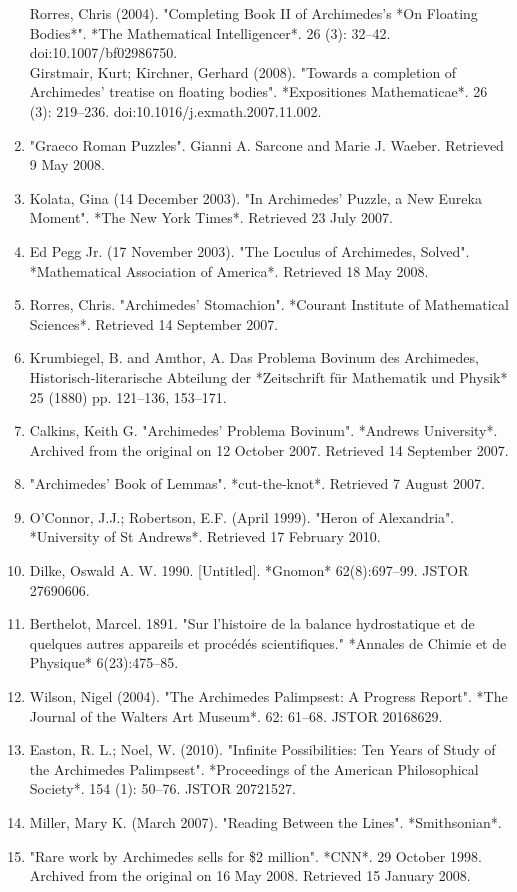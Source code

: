 \begin{enumerate}
Rorres, Chris (2004). "Completing Book II of Archimedes's *On Floating Bodies*". *The Mathematical Intelligencer*. 26 (3): 32–42. doi:10.1007/bf02986750.\\
Girstmair, Kurt; Kirchner, Gerhard (2008). "Towards a completion of Archimedes' treatise on floating bodies". *Expositiones Mathematicae*. 26 (3): 219–236. doi:10.1016/j.exmath.2007.11.002.
\item "Graeco Roman Puzzles". Gianni A. Sarcone and Marie J. Waeber. Retrieved 9 May 2008.
\item Kolata, Gina (14 December 2003). "In Archimedes' Puzzle, a New Eureka Moment". *The New York Times*. Retrieved 23 July 2007.
\item Ed Pegg Jr. (17 November 2003). "The Loculus of Archimedes, Solved". *Mathematical Association of America*. Retrieved 18 May 2008.
\item Rorres, Chris. "Archimedes' Stomachion". *Courant Institute of Mathematical Sciences*. Retrieved 14 September 2007.
\item Krumbiegel, B. and Amthor, A. Das Problema Bovinum des Archimedes, Historisch-literarische Abteilung der *Zeitschrift für Mathematik und Physik* 25 (1880) pp. 121–136, 153–171.
\item Calkins, Keith G. "Archimedes' Problema Bovinum". *Andrews University*. Archived from the original on 12 October 2007. Retrieved 14 September 2007.
\item "Archimedes' Book of Lemmas". *cut-the-knot*. Retrieved 7 August 2007.
\item O'Connor, J.J.; Robertson, E.F. (April 1999). "Heron of Alexandria". *University of St Andrews*. Retrieved 17 February 2010.
\item Dilke, Oswald A. W. 1990. [Untitled]. *Gnomon* 62(8):697–99. JSTOR 27690606.
\item Berthelot, Marcel. 1891. "Sur l'histoire de la balance hydrostatique et de quelques autres appareils et procédés scientifiques." *Annales de Chimie et de Physique* 6(23):475–85.
\item Wilson, Nigel (2004). "The Archimedes Palimpsest: A Progress Report". *The Journal of the Walters Art Museum*. 62: 61–68. JSTOR 20168629.
\item Easton, R. L.; Noel, W. (2010). "Infinite Possibilities: Ten Years of Study of the Archimedes Palimpsest". *Proceedings of the American Philosophical Society*. 154 (1): 50–76. JSTOR 20721527.
\item Miller, Mary K. (March 2007). "Reading Between the Lines". *Smithsonian*.
\item "Rare work by Archimedes sells for \$2 million". *CNN*. 29 October 1998. Archived from the original on 16 May 2008. Retrieved 15 January 2008.




\end{enumerate}
